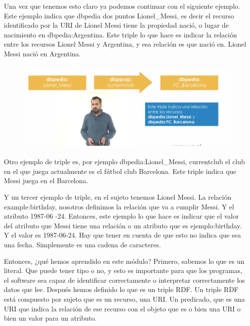 Una vez que tenemos esto claro ya podemos continuar con el siguiente ejemplo. Este ejemplo indica que dbpedia dos puntos Lionel_Messi, es decir el recurso identificado por la URI de Lionel Messi tiene la propiedad nació, o lugar de nacimiento en dbpedia:Argentina. Este triple lo que hace es indicar la relación entre los recursos Lionel Messi y Argentina, y esa relación es que nació en. Lionel Messi nació en Argentina.

\begin{figure}[H]
	\centering
	\includegraphics[height=4.5cm]{imagenes/capitulo3/15} 
	\caption{}
	\label{}
\end{figure}

Otro ejemplo de triple es, por ejemplo dbpedia:Lionel_Messi, currentclub el club en el que juega actualmente es el fútbol club Barcelona. Este triple indica que Messi juega en el Barcelona.

Y un tercer ejemplo de triple, en el sujeto tenemos Lionel Messi. La relación example:birthday, nosotros definimos la relación que va a cumplir Messi. Y el atributo 1987-06 -24. Entonces, este ejemplo lo que hace es indicar que el valor del atributo que Messi tiene una relación o un atributo que es ejemplo:birthday. Y el valor es 1987-06-24. Hay que tener en cuenta de que esto no indica que sea una fecha. Simplemente es una cadena de caracteres.

Entonces, ¿qué hemos aprendido en este módulo? Primero, sabemos lo que es un literal. Que puede tener tipo o no, y esto es importante para que los programas, el software sea capaz de identificar correctamente o interpretar correctamente los datos que lee. Después hemos definido lo que es un triple RDF. Un triple RDF está compuesto por sujeto que es un recurso, una URI. Un predicado, que es una URI que indica la relación de ese recurso con el objeto que es o bien una URI o bien un valor para un atributo.

